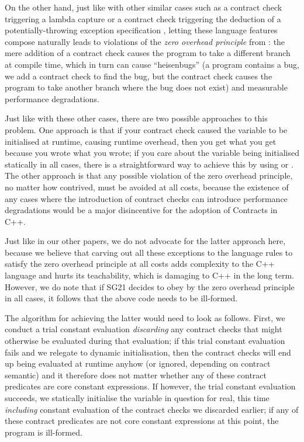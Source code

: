 On the other hand, just like with other similar cases such as a contract check triggering a lambda capture \cite{P2890R1} or a contract check triggering the deduction of a potentially-throwing exception specification \cite{P2969R0}, letting these language features compose naturally leads to violations of the \emph{zero overhead principle} from \cite{P2932R1}: the mere addition of a contract check causes the program to take a different branch at compile time, which in turn can cause ``heisenbugs'' (a program contains a bug, we add a contract check to find the bug, but the contract check causes the program to take another branch where the bug does not exist) and measurable performance degradations.

Just like with these other cases, there are two possible approaches to this problem. One approach is that if your contract check caused the variable to be initialised at runtime, causing runtime overhead, then you get what you get because you wrote what you wrote; if you care about the variable being initialised statically in all cases, there is a straightforward way to achieve this by using  or . The other approach is that any possible violation of the zero overhead principle, no matter how contrived, must be avoided at all costs, because the existence of any cases where the introduction of contract checks can introduce performance degradations would be a major disincentive for the adoption of Contracts in C++.

Just like in our other papers, we do not advocate for the latter approach here, because we believe that carving out all these exceptions to the language rules to satisfy the zero overhead principle at all costs adds complexity to the C++ language and hurts its teachability, which is damaging to C++ in the long term. However, we do note that if SG21 decides to obey by the zero overhead principle in all cases, it follows that the above code needs to be ill-formed.

The algorithm for achieving the latter would need to look as follows. First, we conduct a trial constant evaluation \emph{discarding} any contract checks that might otherwise be evaluated during that evaluation; if this trial constant evaluation fails and we relegate to dynamic initialisation, then the contract checks will end up being evaluated at runtime anyhow (or ignored, depending on contract semantic) and it therefore does not matter whether any of these contract predicates are core constant expressions. If however, the trial constant evaluation succeeds, we statically initialise the variable in question for real, this time \emph{including} constant evaluation of the contract checks we discarded earlier; if any of these contract predicates are not core constant expressions at this point, the program is ill-formed.

